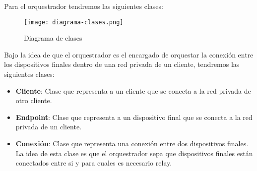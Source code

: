 Para el orquestrador tendremos las siguientes clases:
\begin{figure}[h!]
    \centering
    \texttt{[image: diagrama-clases.png]}
    \caption{Diagrama de clases}
\end{figure}

Bajo la idea de que el orquestrador es el encargado de orquestar la conexión entre los dispositivos finales dentro de una red privada de un cliente, tendremos las siguientes clases:
\begin{itemize}
    \item \textbf{Cliente}: Clase que representa a un cliente que se conecta a la red privada de otro cliente.
    \item \textbf{Endpoint}: Clase que representa a un dispositivo final que se conecta a la red privada de un cliente.
    \item \textbf{Conexión}: Clase que representa una conexión entre dos dispositivos finales. La idea de esta clase es que el orquestrador sepa que dispositivos finales están conectados entre si y para cuales es necesario relay.
\end{itemize}